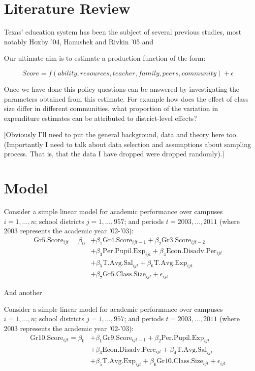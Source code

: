 \documentclass[11pt]{article}
\begin{document}
\section{Literature Review}
\label{s:next}

Texas' education system has been the subject of several previous studies, most notably Hoxby '04, Hanushek and Rivkin '05 and 



Our ultimate aim is to estimate a production function of the form:
  
  $$Score = f(ability,resources,teacher,family,peers,community) + \epsilon$$
  
  Once we have done this policy questions can be answered by investigating the parameters obtained from this estimate. For example how does the effect of class size differ in different communities, what proportion of the variation in expenditure estimates can be attributed to district-level effects?
  
  [Obviously I'll need to put the general background, data and theory here too. (Importantly I need to talk about data selection and assumptions about sampling process. That is, that the data I have dropped were dropped randomly).]

\section{Model}
\label{s:next}

Consider a simple linear model for academic performance over campuses $i=1,\ldots,n$; school districts $j=1,\ldots,957$; and periods $t=2003,\ldots,2011$ (where 2003 represents the academic year '02-'03):
\begin{align*}
\mathrm{Gr5.Score}_{ijt} = \beta_{0} 
    &+ \beta_{1}  \mathrm{Gr4.Score}_{ijt-1} 
    + \beta_{2}  \mathrm{Gr3.Score}_{ijt-2}    \\
    &+ \beta_{3}  \mathrm{Per.Pupil.Exp}_{ijt} 
    + \beta_{4}  \mathrm{Econ.Disadv.Per}_{ijt} \\
    &+ \beta_{5}  \mathrm{T.Avg.Sal}_{ijt}   
    + \beta_{6}  \mathrm{T.Avg.Exp}_{ijt}  \\
    &+ \beta_{7}  \mathrm{Gr5.Class.Size}_{ijt} + \epsilon_{ijt}
\end{align*}

And another

Consider a simple linear model for academic performance over campuses $i=1,\ldots,n$; school districts $j=1,\ldots,957$; and periods $t=2003,\ldots,2011$ (where 2003 represents the academic year '02-'03):
\begin{align*}
\mathrm{Gr10.Score}_{ijt} = \beta_{0} 
    &+ \beta_{1}  \mathrm{Gr9.Score}_{ijt-1} 
    + \beta_{2}  \mathrm{Per.Pupil.Exp}_{ijt} \\
    &+ \beta_{3}  \mathrm{Econ.Disadv.Perc}_{ijt} 
    + \beta_{4}  \mathrm{T.Avg.Sal}_{ijt}  \\
    &+ \beta_{5}  \mathrm{T.Avg.Exp}_{ijt}  
    + \beta_{6}  \mathrm{Gr10.Class.Size}_{ijt} + \epsilon_{ijt}
\end{align*}
\end{document}
